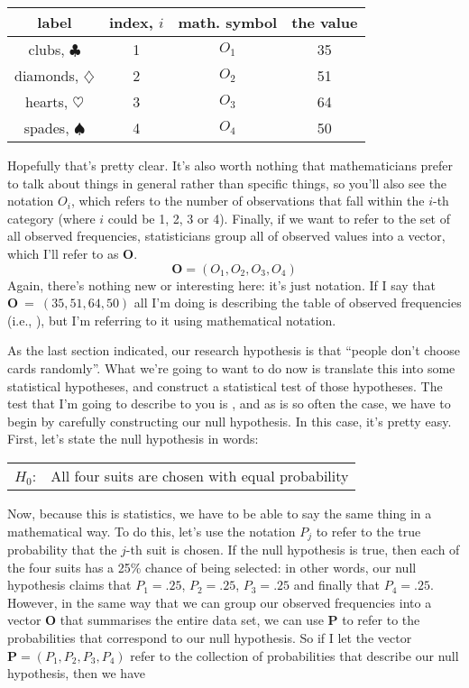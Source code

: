\begin{center}
\begin{tabular}{cc|cc}
label &  index, $i$  & math. symbol &  the value \\  \hline
 clubs, $\clubsuit$ 	& 1 	& $O_1$ & 35 \\
 diamonds, $\diamondsuit$ & 2& $O_2$ & 51 \\
 hearts, $\heartsuit$	&3	& $O_3$ & 64 \\
 spades, $\spadesuit$ &4		& $O_4$ & 50 \\
\end{tabular}
\end{center}

\noindent
Hopefully that's pretty clear. It's also worth nothing that mathematicians prefer to talk about things in general rather than specific things, so you'll also see the notation $O_i$, which refers to the number of observations that fall within the $i$-th category (where $i$ could be 1, 2, 3 or 4). Finally, if we want to refer to the set of all observed frequencies, statisticians group all of observed values into a vector, which I'll refer to as $\bm{O}$. 
$$
\bm{O} = (O_1, O_2, O_3, O_4)
$$
Again, there's nothing new or interesting here: it's just notation. If I say that $\bm{O}~=~(35, 51, 64, 50)$ all I'm doing is describing the table of observed frequencies (i.e., ), but I'm referring to it using mathematical notation. 



As the last section indicated, our research hypothesis is that ``people don't choose cards randomly''. What we're going to want to do now is translate this into some statistical hypotheses, and construct a statistical test of those hypotheses. The test that I'm going to describe to you is , and as is so often the case, we have to begin by carefully constructing our null hypothesis. In this case, it's pretty easy. First, let's state the null hypothesis in words:

\smallskip
\begin{tabular}{ll}
$H_0$: \hspace*{0.5cm} & All four suits are chosen with equal probability
\end{tabular} 
\smallskip

\noindent
Now, because this is statistics, we have to be able to say the same thing in a mathematical way. To do this, let's use the notation $P_j$ to refer to the true probability that the $j$-th suit is chosen. If the null hypothesis is true, then each of the four suits has a 25\% chance of being selected: in other words, our null hypothesis claims that $P_1 = .25$, $P_2 = .25$, $P_3 = .25$ and finally that $P_4 = .25$. However, in the same way that we can group our observed frequencies into a vector $\bm{O}$ that summarises the entire data set, we can use $\bm{P}$ to refer to the probabilities that correspond to our null hypothesis. So if I let the vector $\bm{P} = (P_1, P_2, P_3, P_4)$ refer to the collection of probabilities that describe our null hypothesis, then we have

